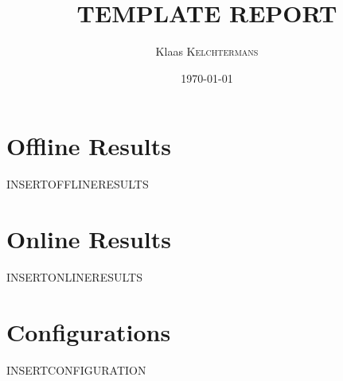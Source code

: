 \documentclass{article}
\title{TEMPLATE REPORT} %
\author{Klaas \textsc{Kelchtermans}} %
\date{\today} %
\begin{document}
\maketitle %



\section{Offline Results}

INSERTOFFLINERESULTS



\section{Online Results}

INSERTONLINERESULTS


\section{Configurations}

INSERTCONFIGURATION
\end{document}

